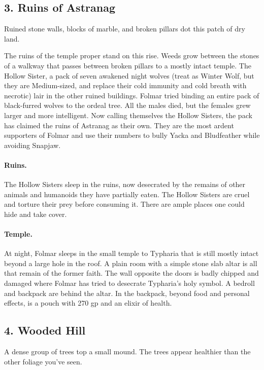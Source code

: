 \documentclass[10pt,a4paper,twoside,twocolumn,openany,bg=print,nodeprecatedcode]{dndbook}
\begin{document}
\subsection{3. Ruins of Astranag}
\begin{DndReadAloud}{}
Ruined stone walls, blocks of marble, and broken pillars dot this patch of dry land.
\end{DndReadAloud}

The ruins of the temple proper stand on this rise. Weeds grow between the stones of a walkway that passes between broken pillars to a mostly intact temple. The Hollow Sister, a pack of seven awakened night wolves (treat as Winter Wolf, but they are Medium-sized, and replace their cold immunity and cold breath with necrotic) lair in the other ruined buildings. Folmar tried binding an entire pack of black-furred wolves to the ordeal tree. All the males died, but the females grew larger and more intelligent. Now calling themselves the Hollow Sisters, the pack has claimed the ruins of Astranag as their own. They are the most ardent supporters of Folmar and use their numbers to bully Yacka and Bludfeather while avoiding Snapjaw.
\paragraph{Ruins.}
The Hollow Sisters sleep in the ruins, now desecrated by the remains of other animals and humanoids they have partially eaten. The Hollow Sisters are cruel and torture their prey before consuming it. There are ample places one could hide and take cover.
\paragraph{Temple.}
At night, Folmar sleeps in the small temple to Typharia that is still mostly intact beyond a large hole in the roof. A plain room with a simple stone slab altar is all that remain of the former faith. The wall opposite the doors is badly chipped and damaged where Folmar has tried to desecrate Typharia's holy symbol. A bedroll and backpack are behind the altar. In the backpack, beyond food and personal effects, is a pouch with 270 gp and an elixir of health.
\subsection{4. Wooded Hill}
\begin{DndReadAloud}{}
A dense group of trees top a small mound. The trees appear healthier than the other foliage you've seen.
\end{DndReadAloud}
\end{document}
